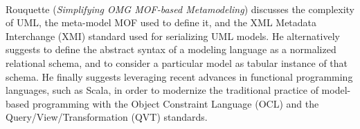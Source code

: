 

\ \hline \ %

Rouquette
\cite{isola-2016-rouquette}
({\em Simplifying OMG MOF-based Metamodeling})
discusses the complexity of UML, the meta-model MOF used to 
define it, and the XML Metadata Interchange (XMI) standard
used for serializing UML models. He alternatively suggests
to define the abstract syntax of a modeling language as 
a normalized relational schema, and to consider a particular
model as tabular instance of that schema. 
He finally suggests leveraging recent advances in functional programming languages, such as Scala, in order 
to modernize the traditional practice of model-based
programming with the Object Constraint Language (OCL) and the
Query/View/Transformation (QVT) standards. 

\done{}
